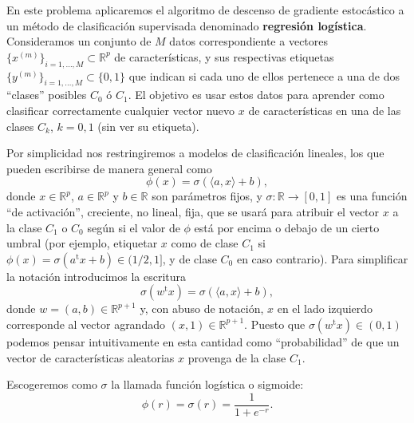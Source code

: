 En este problema aplicaremos el algoritmo de descenso de gradiente estocástico a un m\'etodo de clasificación supervisada denominado {\bf regresi\'on log\'istica}.  Consideramos un conjunto de $M$ datos correspondiente a vectores   $\{x^{(m)}\}_{i=1,\dots,M} \subset \mathbb{R}^p$ de caracter\'isticas,  y  sus respectivas etiquetas  $\{y^{(m)}\}_{i=1,\dots,M} \subset \{0,1\}$ que indican si cada uno de ellos pertenece a  una de dos ``clases''  posibles $C_0$ ó $C_1$. El objetivo es usar estos datos para aprender como clasificar correctamente cualquier vector nuevo $x$ de caracter\'isticas  en una de las clases $C_k$, $k=0,1$ (sin ver su etiqueta).

Por simplicidad nos restringiremos a modelos de clasificación lineales, los que pueden escribirse de manera general como
\[  \phi(x)=\sigma\left( \langle a, x\rangle + b  \right), \]
donde  $x\in \mathbb{R}^p$, $a\in \mathbb{R}^p$  y $b\in \mathbb{R}$ son par\'ametros fijos,  y $\sigma: \mathbb{R}\to [0,1]$ es una función ``de activación'', creciente, no lineal, fija,  que se usar\'a para atribuir el vector $x$ a la clase $C_1$ o $C_0$ seg\'un si el valor de $\phi$ est\'a por encima o debajo de un cierto umbral (por ejemplo, etiquetar $x$ como de clase $C_1$ si $\phi(x)=\sigma   ( a^\mathrm{t}x + b) \in (1/2, 1]$, y de clase $C_0$ en caso contrario).  
 Para simplificar la notación introducimos la  escritura
\[  \sigma(w^\mathrm{t}x) =  \sigma\left( \langle a, x \rangle+ b  \right), \]
donde  $w = (a,b)\in \mathbb{R}^{p+1}$ y, con abuso de notaci\'on, $x$ en el lado izquierdo corresponde  al vector agrandado $ (x,1)\in\mathbb{R}^{p+1}$.  Puesto que $\sigma(w^\mathrm{t}x)\in (0,1)$ podemos pensar  intuitivamente en esta cantidad como  ``probabilidad'' de que un vector de caracter\'isticas aleatorias  $x$  provenga de la clase $C_1$.  

Escogeremos como $\sigma$ la llamada función logística o sigmoide: 
\[ \phi(r)=\sigma(r) = \frac{1}{1+e^{-r}}. \]


